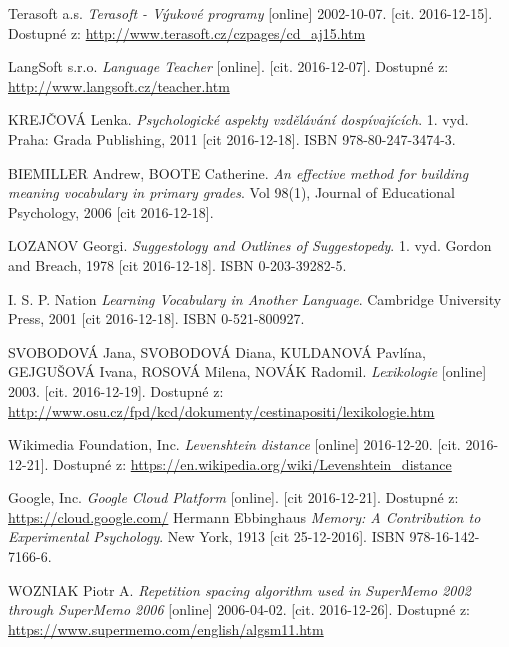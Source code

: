 \documentclass[a4paper,11pt,titlepage,fleqn]{article}
\begin{document}
\newpage
\begin{thebibliography}{99}
    

        Terasoft a.s. \textit{Terasoft - Výukové programy} [online] 2002-10-07. [cit. 2016-12-15]. Dostupné z: \url{http://www.terasoft.cz/czpages/cd_aj15.htm}
    
        LangSoft s.r.o. \textit{Language Teacher} [online]. [cit. 2016-12-07]. Dostupné z: \url{http://www.langsoft.cz/teacher.htm}

        KREJČOVÁ Lenka. \textit{Psychologické aspekty vzdělávání dospívajících}. 1. vyd. Praha: Grada Publishing, 2011 [cit 2016-12-18]. ISBN 978-80-247-3474-3.

        BIEMILLER Andrew, BOOTE Catherine. \textit{An effective method for building meaning vocabulary in primary grades}. Vol 98(1), Journal of Educational Psychology, 2006 [cit 2016-12-18].

        LOZANOV Georgi. \textit{Suggestology and Outlines of Suggestopedy}. 1. vyd. Gordon and Breach, 1978 [cit 2016-12-18]. ISBN 0-203-39282-5.

        I. S. P. Nation \textit{Learning Vocabulary in Another Language}. Cambridge University Press, 2001 [cit 2016-12-18]. ISBN 0-521-800927.

        SVOBODOVÁ Jana, SVOBODOVÁ Diana, KULDANOVÁ Pavlína, GEJGUŠOVÁ Ivana, ROSOVÁ Milena, NOVÁK Radomil. \textit{Lexikologie} [online] 2003. [cit. 2016-12-19]. Dostupné z: \url{http://www.osu.cz/fpd/kcd/dokumenty/cestinapositi/lexikologie.htm}

         Wikimedia Foundation, Inc. \textit{Levenshtein distance} [online] 2016-12-20. [cit. 2016-12-21]. Dostupné z: \url{https://en.wikipedia.org/wiki/Levenshtein_distance}
        
        Google, Inc. \textit{Google Cloud Platform} [online]. [cit 2016-12-21]. Dostupné z: \url{https://cloud.google.com/}
		Hermann Ebbinghaus \textit{Memory: A Contribution to Experimental Psychology}. New York, 1913 [cit 25-12-2016]. ISBN 978-16-142-7166-6.

        WOZNIAK Piotr A. \textit{Repetition spacing algorithm used in SuperMemo 2002 through SuperMemo 2006} [online] 2006-04-02. [cit. 2016-12-26]. Dostupné z: \url{https://www.supermemo.com/english/algsm11.htm}


\end{thebibliography}
\end{document}
